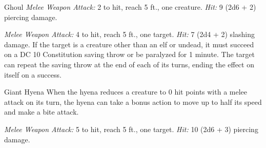 \documentclass[10pt,a4paper,twoside,bg=print,twocolumn,openany,nodeprecatedcode]{dndbook}
\begin{document}
\begin{DndMonster}[float=t]{Ghoul}
\DndMonsterBasics[
armor-class = {12},
hit-points = {\DndDice{5d8}},
speed = {30 ft.}
]
\DndMonsterAbilityScores[
 str = 13,
 dex = 15,
 con = 10,
 int = 7,
 wis = 10,
 cha = 6
]
\DndMonsterDetails[
damage-immunities = {poison},
condition-immunities = {charmed, exhaustion, poisoned},
senses = {darkvision 60 ft., passive perception 10},
languages = {Common},
challenge = 1,
]
\textsl{Melee Weapon Attack:} 2 to hit, reach 5 ft., one creature. \textsl{Hit:} 9 (2d6 + 2) piercing damage.

\textsl{Melee Weapon Attack:} 4 to hit, reach 5 ft., one target. \textsl{Hit:} 7 (2d4 + 2) slashing damage. If the target is a creature other than an elf or undead, it must succeed on a DC 10 Constitution saving throw or be paralyzed for 1 minute. The target can repeat the saving throw at the end of each of its turns, ending the effect on itself on a success.

\end{DndMonster}



\begin{DndMonster}[float=t]{Giant Hyena}
\DndMonsterBasics[
armor-class = {12},
hit-points = {\DndDice{6d10 + 12}},
speed = {50 ft.}
]
\DndMonsterAbilityScores[
 str = 16,
 dex = 14,
 con = 14,
 int = 2,
 wis = 12,
 cha = 7
]
\DndMonsterDetails[
skills = {Perception +3},
challenge = 1,
]
When the hyena reduces a creature to 0 hit points with a melee attack on its turn, the hyena can take a bonus action to move up to half its speed and make a bite attack.

\textsl{Melee Weapon Attack:} 5 to hit, reach 5 ft., one target. \textsl{Hit:} 10 (2d6 + 3) piercing damage.

\end{DndMonster}
\end{document}
